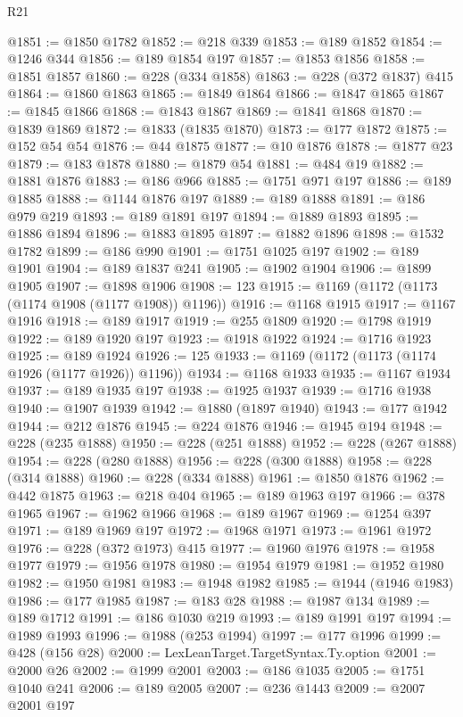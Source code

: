 \begin{lexlean}{R21}
\begin{coremodule}
@1851 := @1850 @1782
@1852 := @218 @339
@1853 := @189 @1852
@1854 := @1246 @344
@1856 := @189 @1854 @197
@1857 := @1853 @1856
@1858 := @1851 @1857
@1860 := @228 (@334 @1858)
@1863 := @228 (@372 @1837) @415
@1864 := @1860 @1863
@1865 := @1849 @1864
@1866 := @1847 @1865
@1867 := @1845 @1866
@1868 := @1843 @1867
@1869 := @1841 @1868
@1870 := @1839 @1869
@1872 := @1833 (@1835 @1870)
@1873 := @177 @1872
@1875 := @152 @54 @54
@1876 := @44 @1875
@1877 := @10 @1876
@1878 := @1877 @23
@1879 := @183 @1878
@1880 := @1879 @54
@1881 := @484 @19
@1882 := @1881 @1876
@1883 := @186 @966
@1885 := @1751 @971 @197
@1886 := @189 @1885
@1888 := @1144 @1876 @197
@1889 := @189 @1888
@1891 := @186 @979 @219
@1893 := @189 @1891 @197
@1894 := @1889 @1893
@1895 := @1886 @1894
@1896 := @1883 @1895
@1897 := @1882 @1896
@1898 := @1532 @1782
@1899 := @186 @990
@1901 := @1751 @1025 @197
@1902 := @189 @1901
@1904 := @189 @1837 @241
@1905 := @1902 @1904
@1906 := @1899 @1905
@1907 := @1898 @1906
@1908 := 123
@1915 := @1169 (@1172 (@1173 (@1174 @1908 (@1177 @1908)) @1196))
@1916 := @1168 @1915
@1917 := @1167 @1916
@1918 := @189 @1917
@1919 := @255 @1809
@1920 := @1798 @1919
@1922 := @189 @1920 @197
@1923 := @1918 @1922
@1924 := @1716 @1923
@1925 := @189 @1924
@1926 := 125
@1933 := @1169 (@1172 (@1173 (@1174 @1926 (@1177 @1926)) @1196))
@1934 := @1168 @1933
@1935 := @1167 @1934
@1937 := @189 @1935 @197
@1938 := @1925 @1937
@1939 := @1716 @1938
@1940 := @1907 @1939
@1942 := @1880 (@1897 @1940)
@1943 := @177 @1942
@1944 := @212 @1876
@1945 := @224 @1876
@1946 := @1945 @194
@1948 := @228 (@235 @1888)
@1950 := @228 (@251 @1888)
@1952 := @228 (@267 @1888)
@1954 := @228 (@280 @1888)
@1956 := @228 (@300 @1888)
@1958 := @228 (@314 @1888)
@1960 := @228 (@334 @1888)
@1961 := @1850 @1876
@1962 := @442 @1875
@1963 := @218 @404
@1965 := @189 @1963 @197
@1966 := @378 @1965
@1967 := @1962 @1966
@1968 := @189 @1967
@1969 := @1254 @397
@1971 := @189 @1969 @197
@1972 := @1968 @1971
@1973 := @1961 @1972
@1976 := @228 (@372 @1973) @415
@1977 := @1960 @1976
@1978 := @1958 @1977
@1979 := @1956 @1978
@1980 := @1954 @1979
@1981 := @1952 @1980
@1982 := @1950 @1981
@1983 := @1948 @1982
@1985 := @1944 (@1946 @1983)
@1986 := @177 @1985
@1987 := @183 @28
@1988 := @1987 @134
@1989 := @189 @1712
@1991 := @186 @1030 @219
@1993 := @189 @1991 @197
@1994 := @1989 @1993
@1996 := @1988 (@253 @1994)
@1997 := @177 @1996
@1999 := @428 (@156 @28)
@2000 := LexLeanTarget.TargetSyntax.Ty.option
@2001 := @2000 @26
@2002 := @1999 @2001
@2003 := @186 @1035
@2005 := @1751 @1040 @241
@2006 := @189 @2005
@2007 := @236 @1443
@2009 := @2007 @2001 @197

\end{coremodule}
\end{lexlean}
